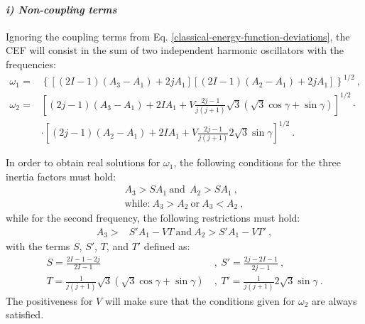 \paragraph*{\textit{i) Non-coupling terms}}
Ignoring the coupling terms from Eq. \ref{classical-energy-function-deviations}, the CEF will consist in the sum of two independent harmonic oscillators with the frequencies:
\begin{align}
    \omega_1=&\left\{\left[(2I-1)(A_3-A_1)+2jA_1\right]\left[(2I-1)(A_2-A_1)+2jA_1\right]\right\}^{1/2}\ ,\nonumber\\
    \omega_2=&\left[(2j-1)(A_3-A_1)+2IA_1+V\frac{2j-1}{j(j+1)}\sqrt{3}\left(\sqrt{3}\cos\gamma+\sin\gamma\right)\right]^{1/2}\cdot\nonumber\\
    &\cdot\left[(2j-1)(A_2-A_1)+2IA_1+V\frac{2j-1}{j(j+1)}2\sqrt{3}\sin\gamma\right]^{1/2}\ .
    \label{small-omega-1-2}
\end{align}

In order to obtain real solutions for $\omega_1$, the following conditions for the three inertia factors must hold:
\begin{align}
    A_3>SA_1\ \text{and}\ \ A_2>SA_1\ ,\nonumber\\
    \text{while:}\ A_3>A_2\ \text{or}\ A_3<A_2\ , 
\end{align}
while for the second frequency, the following restrictions must hold:
\begin{align}
    A_3>&S'A_1-VT\ \text{and}\ A_2>S'A_1-VT'\ ,\nonumber
\end{align}
with the terms $S$, $S'$, $T$, and $T'$ defined as:
\begin{align}
    S=\frac{2I-1-2j}{2I-1}\ &,\  S'=\frac{2j-2I-1}{2j-1}\ ,\nonumber\\
    T=\frac{1}{j(j+1)}\sqrt{3}\left(\sqrt{3}\cos\gamma+\sin\gamma\right)\ &,\ T'=\frac{1}{j(j+1)}2\sqrt{3}\sin\gamma\ .
\end{align}
The positiveness for $V$ will make sure that the conditions given for $\omega_2$ are always satisfied.

